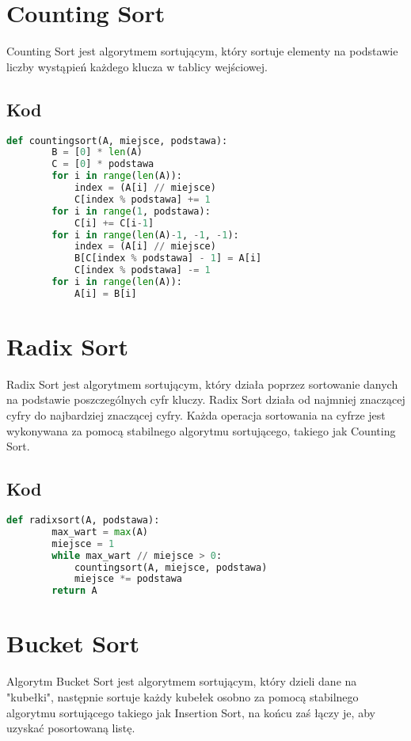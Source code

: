 \documentclass{article}
\begin{document}
\section{Counting Sort}
Counting Sort jest algorytmem sortującym, który sortuje elementy na podstawie liczby wystąpień każdego klucza w tablicy wejściowej.

\subsection{Kod}

\begin{lstlisting}[language=Python]
    def countingsort(A, miejsce, podstawa):
        B = [0] * len(A)
        C = [0] * podstawa
        for i in range(len(A)):
            index = (A[i] // miejsce)
            C[index % podstawa] += 1
        for i in range(1, podstawa):
            C[i] += C[i-1]
        for i in range(len(A)-1, -1, -1):
            index = (A[i] // miejsce)
            B[C[index % podstawa] - 1] = A[i]
            C[index % podstawa] -= 1
        for i in range(len(A)):
            A[i] = B[i]
\end{lstlisting}

\section{Radix Sort}
Radix Sort jest algorytmem sortującym, który działa poprzez sortowanie danych na podstawie poszczególnych cyfr kluczy. Radix Sort działa od najmniej znaczącej cyfry do najbardziej znaczącej cyfry. Każda operacja sortowania na cyfrze jest wykonywana za pomocą stabilnego algorytmu sortującego, takiego jak Counting Sort.\indent

\subsection{Kod}
\begin{lstlisting}[language=Python]
    def radixsort(A, podstawa):
        max_wart = max(A)
        miejsce = 1
        while max_wart // miejsce > 0:
            countingsort(A, miejsce, podstawa)
            miejsce *= podstawa
        return A
\end{lstlisting}

\section{Bucket Sort}
Algorytm Bucket Sort jest algorytmem sortującym, który dzieli dane na "kubełki", następnie sortuje każdy kubełek osobno za pomocą stabilnego algorytmu sortującego takiego jak Insertion Sort, na końcu zaś łączy je, aby uzyskać posortowaną listę.
\end{document}
